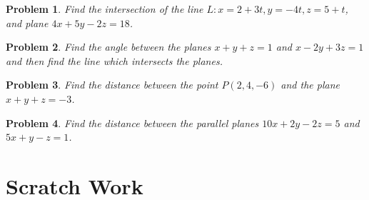 \documentclass[11pt]{article}
\newtheorem{problem}{Problem}
\begin{document}
\vspace{6cm}

\begin{problem}
    Find the intersection of the line $L: x = 2+3t,y=-4t, z = 5+t$, and plane $4x+5y-2z = 18$.
\end{problem}

\vspace{6cm}

\begin{problem}
    Find the angle between the planes $x+y+z=1$ and $x-2y+3z = 1$ and then find the line which intersects the planes.
\end{problem}

\vspace{6cm}

\begin{problem}
    Find the distance between the point $P(2,4,-6)$ and the plane $x+y+z = -3$.
\end{problem}


\vspace{6cm}


\begin{problem}
    Find the distance between the parallel planes $10x+2y-2z=5$ and $5x+y-z = 1$.
\end{problem}

\newpage


\section{Scratch Work}
\end{document}
